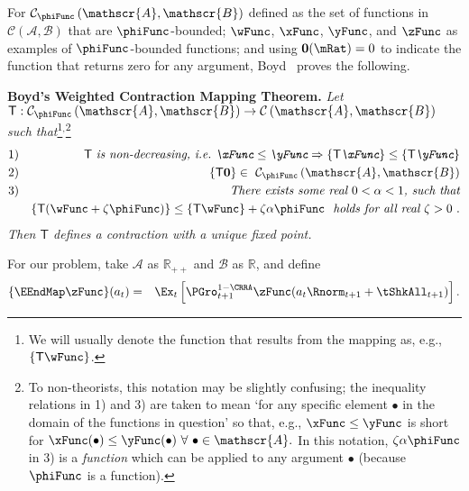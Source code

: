 \documentclass[titlepage]{\econtex}\providecommand{\texname}{BufferStockTheory}
\begin{document}
For $\mathcal{C}_{\phiFunc }\left( \mathscr{A},\mathscr{B}\right) $
defined as the set of functions in
$\mathcal{C}(\mathscr{A},\mathscr{B})$ that are $\phiFunc$-bounded;
$\wFunc$, $\xFunc$, $\yFunc$, and $\zFunc$ as examples of
$\phiFunc$-bounded functions; and using $\mathbf{0}(\mRat)=0$ to
indicate the function that returns zero for any argument,
Boyd~\citeyearpar{jboydWeighted} proves the following.

\newcommand{\BoydT}{\mathsf{T}}
\newcommand{\Shrinker}{\alpha}
\textbf{Boyd's Weighted Contraction Mapping Theorem.} \textit{Let $\BoydT:\mathcal{C}_{\phiFunc }\left( \mathscr{A},\mathscr{B}\right)
\rightarrow \mathcal{C}\left( \mathscr{A},\mathscr{B}\right) $ such
that}\footnote{We will usually denote the function that results from the mapping as, e.g., $\{\BoydT\wFunc\}$.}$^,$\footnote{To non-theorists, this notation may be slightly confusing; the inequality relations in 1) and 3) are taken to mean `for any specific element $\bullet$ in the domain of the functions in question' so that, e.g., $\xFunc \leq \yFunc$ is short for $\xFunc(\bullet) \leq \yFunc(\bullet)~\forall~\bullet\in \mathscr{A}.$  In this notation, $\zeta \Shrinker \phiFunc$ in 3) is a {\it function} which can be applied to any argument $\bullet$ (because $\phiFunc$ is a function).} \nopagebreak
\begin{eqnarray*}
\mbox{1)} &&\BoydT%
\mbox{ {\it is non-decreasing, i.e.\ ${\xFunc} \leq {\yFunc}\Rightarrow
\{\BoydT{\xFunc}\} \leq \{\BoydT{\yFunc}\}$}}   \nonumber \\
\mbox{2)} && \{\BoydT\mathbf{0}\}\in ~ \mathcal{C}_{\phiFunc }\left(\mathscr{A},\mathscr{B}\right)  \notag \\
\mbox{3)}
&& \mbox{\it There exists some real $0 < \Shrinker < 1$, such that} \\
&& \{\BoydT({\wFunc} +\zeta\phiFunc )\} \leq \{\BoydT{\wFunc}\} +\zeta\Shrinker \phiFunc
\mbox{ {\it ~holds for all real $\zeta > 0$} }.
\end{eqnarray*}%
\textit{Then $\BoydT$ defines a contraction with a unique fixed point.}

For our problem, take $\mathscr{A}$ as $\mathbb{R}_{++}$ and $\mathscr{B}$
as $\mathbb{R}$, and define
\begin{eqnarray*}
  \{\EEndMap \zFunc\}(a_{t}) & = & \Ex_{t}\left[\PGro^{1-\CRRA}_{t+1} \zFunc(a_{t} \Rnorm_{t+1} + \tShkAll_{t+1})\right].
\end{eqnarray*}
\end{document}

